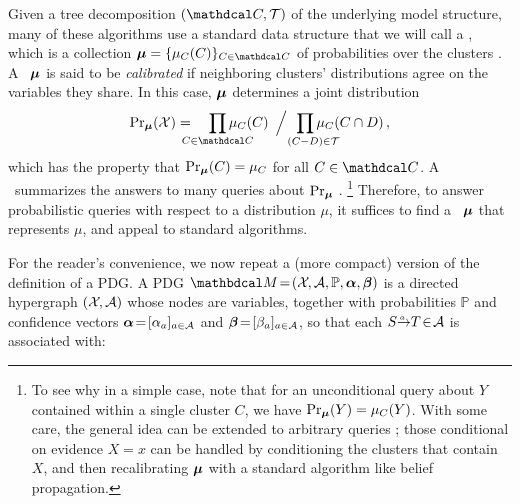 Given a tree decomposition $(\C, \mathcal T)$ of the 
underlying model structure,
many of these algorithms
use a 
standard
data structure
that we will call a \emph{\actree},
which
is a collection
$\bmu = \{\mu_C(C)\}_{ C \in \C}$ 
of probabilities over the clusters \parencite[\S10]{koller2009probabilistic}.
A \actree\
$\boldsymbol\mu$ 
is said to be \emph{calibrated} if neighboring clusters' distributions agree on the variables 
they share.
In this case, 
$\boldsymbol\mu$ determines a joint distribution 
\begin{equation}
    \Pr\nolimits_{\bmu}
    (\X)
        = \quad 
        {\prod_{\mathclap{C \in \C}} \mu_C(C)~\,}\Big/
        {~~\prod_{\mathclap{(C{-}D) \mathrlap{\in \cal T}}} \mu_{C}(C \cap D)\,,}
    \label{eq:cliquedist}
\end{equation}
which has the property that $\Pr_{\boldsymbol\mu}(C) = \mu_C$ for 
all
$C \in \C$.
A \cactree\ summarizes the answers to
many queries about $\Pr_{\boldsymbol\mu}$
\parencite[see][\S 10.3.3]{koller2009probabilistic}.
    \unskip\footnote{To see why
    in a simple case, note that 
    for an unconditional query about $Y$ contained within a single cluster $C$, we have
    $\Pr_{\boldsymbol\mu}(Y) = \mu_C(Y)$.
    With some care, the general idea can be extended to arbitrary queries 
        \parencite[see][\S 10.3.3]{koller2009probabilistic};
        those conditional on evidence $X{=}x$ can be handled
        by conditioning the clusters that contain $X$,
        and then recalibrating $\boldsymbol\mu$ with 
        a standard algorithm like belief propagation.
    }
Therefore, to answer probabilistic queries with respect to a distribution $\mu$, it suffices to find a \cactree\ $\boldsymbol\mu$ that represents $\mu$, and appeal to standard algorithms.

For the reader's convenience, we now repeat a (more compact) version of the definition of a PDG.
    A PDG $\dg M \!=\! (\X\mskip-2mu, \Ar,
        \mathbb P, 
        \balpha, \bbeta )
    $
    is a directed hypergraph $(\mathcal X\mskip-2mu, \mathcal A)$ 
    whose nodes are variables, together with probabilities $\mathbb P$
    and confidence vectors
    $\boldsymbol\alpha \!=\! [\alpha_a]_{a \in \mathcal A}$ 
    and $\boldsymbol\beta \!=\! [\beta_a]_{a \in \mathcal A}$,
    so that each $\ed aST \! \in\! \Ar$ is associated with:
    
